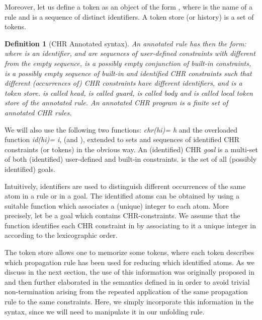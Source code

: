 \documentclass{tlp}
\newtheorem{definition}{Definition} \newtheorem{proposition}{Proposition} \newtheorem{example}{Example} \newtheorem{corollary}{Corollary} \newtheorem{theorem}{Theorem} \newtheorem{lemma}{Lemma}
\begin{document}
Moreover, let us define a token as an object of the form , where 
is the name of a rule and  is a sequence of distinct identifiers.
A token store (or history) is a set of tokens.



\begin{definition}[{\sc CHR Annotated syntax}]
An {\em annotated} rule has then the form:
 where 
is an identifier,  and  are
sequences of user-defined constraints with
 different from the empty sequence,  is a possibly empty conjunction of built-in constraints,
 is a possibly empty sequence of built-in and identified CHR constraints
such that different (occurrences of) CHR constraints have different identifiers,
and  is a token store.
 is called
\emph{head},  is called \emph{guard},  is called \emph{body} and
 is called \emph{local token store} of the annotated rule.
An annotated CHR program is a finite set of annotated CHR rules.

\end{definition}



We will also use the following two functions: {\em chr(hi)= h} and the overloaded
function {\em id(hi)= i}, (and ),
extended to sets and sequences of identified CHR constraints (or tokens) in
the obvious way. An (identified) CHR {\em goal} is a multi-set of
both (identified) user-defined and built-in constraints.
 is the set of all (possibly
identified) goals.


Intuitively, identifiers are used to distinguish different
occurrences of the same atom in a rule or in a goal. The identified atoms can
be obtained by using a suitable function which associates a
(unique) integer to each atom. More precisely, let  be a goal
which contains  CHR-constraints. We assume that the function
 identifies each CHR constraint in  by
associating to it a unique integer in  according to the
lexicographic order.

The token store allows one to memorize  some tokens,
where each token describes which propagation rule has been used
for reducing which identified atoms.
As we discuss
in the next section, the use of this information was originally proposed
in \cite{Abd97} and then further elaborated in the semantics defined
in \cite{DSGH04} in order to avoid trivial  non-termination
arising from the repeated application of the same propagation rule
to the same constraints. Here, we simply incorporate this
information in the syntax, since we will need to manipulate it in
our unfolding rule.
\end{document}
